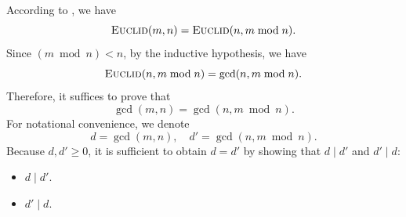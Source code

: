 \documentclass{tufte-handout}
\begin{document}
\begin{CJK*}{UTF8}{gbsn}
\begin{description}
    According to \euclid{}, we have
    \[
      \textsc{Euclid}(m,n) = \textsc{Euclid}(n, m \bmod n).
    \]
    Since $(m \bmod n) < n$, by the inductive hypothesis, we have
    \[
      \textsc{Euclid}(n, m \bmod n) = \gcd(n, m \bmod n).
    \]
    Therefore, it suffices to prove that
    \[
      \boxed{\gcd(m,n) = \gcd(n, m \bmod n).}
    \]
    For notational convenience, we denote
    \[
      d = \gcd(m,n), \quad d' = \gcd(n, m \bmod n).
    \]
    Because $d, d' \ge 0$, it is sufficient to obtain $d = d'$
    by showing that $d \mid d'$ and $d' \mid d$:

    \begin{itemize}
      \item $d \mid d'$.
      \item $d' \mid d$.
    \end{itemize}
\end{description}




\end{CJK*}
\end{document}
